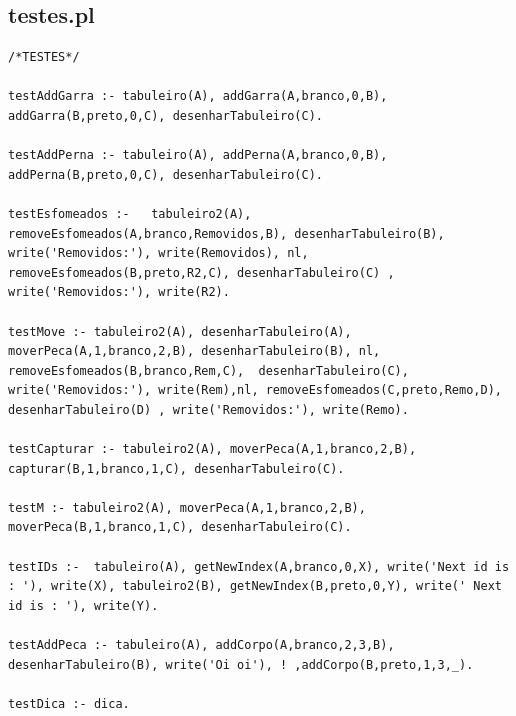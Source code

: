 \documentclass[a4paper]{article}
\begin{document}
\subsection{testes.pl}
\begin{lstlisting}
/*TESTES*/

testAddGarra :- tabuleiro(A), addGarra(A,branco,0,B), addGarra(B,preto,0,C), desenharTabuleiro(C).

testAddPerna :- tabuleiro(A), addPerna(A,branco,0,B), addPerna(B,preto,0,C), desenharTabuleiro(C).

testEsfomeados :-   tabuleiro2(A), removeEsfomeados(A,branco,Removidos,B), desenharTabuleiro(B), write('Removidos:'), write(Removidos), nl, removeEsfomeados(B,preto,R2,C), desenharTabuleiro(C) , write('Removidos:'), write(R2).

testMove :- tabuleiro2(A), desenharTabuleiro(A), moverPeca(A,1,branco,2,B), desenharTabuleiro(B), nl, removeEsfomeados(B,branco,Rem,C),  desenharTabuleiro(C), write('Removidos:'), write(Rem),nl, removeEsfomeados(C,preto,Remo,D), desenharTabuleiro(D) , write('Removidos:'), write(Remo).

testCapturar :- tabuleiro2(A), moverPeca(A,1,branco,2,B), capturar(B,1,branco,1,C), desenharTabuleiro(C).

testM :- tabuleiro2(A), moverPeca(A,1,branco,2,B), moverPeca(B,1,branco,1,C), desenharTabuleiro(C).

testIDs :-  tabuleiro(A), getNewIndex(A,branco,0,X), write('Next id is : '), write(X), tabuleiro2(B), getNewIndex(B,preto,0,Y), write(' Next id is : '), write(Y).

testAddPeca :- tabuleiro(A), addCorpo(A,branco,2,3,B), desenharTabuleiro(B), write('Oi oi'), ! ,addCorpo(B,preto,1,3,_).

testDica :- dica.
\end{lstlisting}
\end{document}

